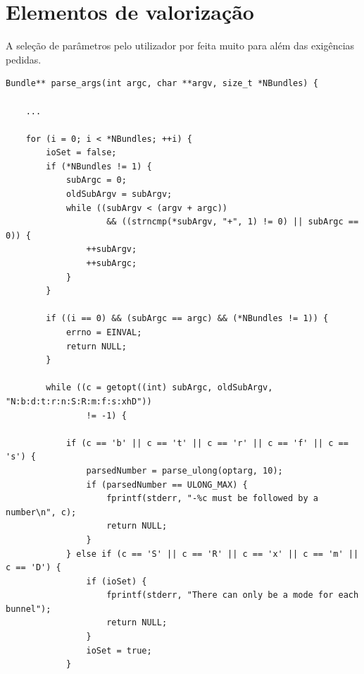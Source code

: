 \documentclass[a4paper]{article}
\begin{document}
\section{Elementos de valorização}
A seleção de parâmetros pelo utilizador por feita muito para além das exigências
pedidas.
\begin{verbatim}
Bundle** parse_args(int argc, char **argv, size_t *NBundles) {

    ...

    for (i = 0; i < *NBundles; ++i) {
        ioSet = false;
        if (*NBundles != 1) {
            subArgc = 0;
            oldSubArgv = subArgv;
            while ((subArgv < (argv + argc))
                    && ((strncmp(*subArgv, "+", 1) != 0) || subArgc == 0)) {
                ++subArgv;
                ++subArgc;
            }
        }

        if ((i == 0) && (subArgc == argc) && (*NBundles != 1)) {
            errno = EINVAL;
            return NULL;
        }

        while ((c = getopt((int) subArgc, oldSubArgv, "N:b:d:t:r:n:S:R:m:f:s:xhD"))
                != -1) {

            if (c == 'b' || c == 't' || c == 'r' || c == 'f' || c == 's') {
                parsedNumber = parse_ulong(optarg, 10);
                if (parsedNumber == ULONG_MAX) {
                    fprintf(stderr, "-%c must be followed by a number\n", c);
                    return NULL;
                }
            } else if (c == 'S' || c == 'R' || c == 'x' || c == 'm' || c == 'D') {
                if (ioSet) {
                    fprintf(stderr, "There can only be a mode for each bunnel");
                    return NULL;
                }
                ioSet = true;
            }


\end{verbatim}
\end{document}
